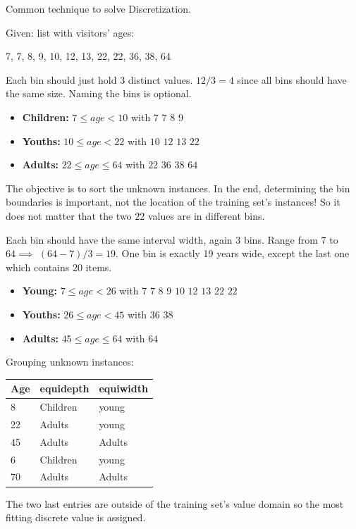 \begin{breakbox}
Common technique to solve Discretization.

Given: list with visitors' ages:
\begin{center}
7, 7, 8, 9, 10, 12, 13, 22, 22, 36, 38, 64
\end{center}

\begin{breakbox}
Each bin should just hold 3 distinct values. $12/3=4$ since all bins should have the same size. Naming the bins is optional.

\begin{itemize}
	\item \textbf{Children:} $7 \leq age < 10$ with $7$ $7$ $8$ $9$
	\item \textbf{Youths:} $10 \leq age < 22$ with $10$ $12$ $13$ $22$
	\item \textbf{Adults:} $22 \leq age \leq 64$ with $22$ $36$ $38$ $64$
\end{itemize}

The objective is to sort the unknown instances. In the end, determining the bin boundaries is important, not the location of the training set's instances! So it does not matter that the two $22$ values are in different bins.
\end{breakbox}



\begin{breakbox}
Each bin should have the same interval width, again 3 bins.  Range from $7$ to $64 \implies$ $(64-7)/3=19$. One bin is exactly 19 years wide, except the last one which contains 20 items.

\begin{itemize}
	\item \textbf{Young:} $7 \leq age < 26$ with $7$ $7$ $8$ $9$ $10$ $12$ $13$ $22$ $22$
	\item \textbf{Youths:} $26 \leq age < 45$ with $36$ $38$
	\item \textbf{Adults:} $45 \leq age \leq 64$ with $64$	
\end{itemize}
\end{breakbox}

Grouping unknown instances:

\begin{tabular}{l|l|l}
\textbf{Age} & \textbf{equidepth} & \textbf{equiwidth} \\
\hline
8   & Children  & young     \\
22  & Adults    & young     \\
45  & Adults    & Adults    \\
6   & Children  & young     \\
70  & Adults    & Adults      
\end{tabular}

The two last entries are outside of the training set's value domain so the most fitting discrete value is assigned.
\end{breakbox}




